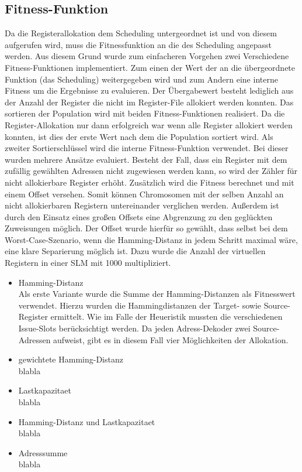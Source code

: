 \subsection{Fitness-Funktion}
\label{chap:Fitness-Funktion}
Da die Registerallokation dem Scheduling untergeordnet ist und von diesem aufgerufen wird, muss die Fitnessfunktion an die des Scheduling angepasst werden. Aus diesem Grund wurde zum einfacheren Vorgehen zwei Verschiedene Fitness-Funktionen implementiert. Zum einen der Wert der an die übergeordnete Funktion (das Scheduling) weitergegeben wird und zum Andern eine interne Fitness um die Ergebnisse zu evaluieren.
Der Übergabewert besteht lediglich aus der Anzahl der Register die nicht im Register-File allokiert werden konnten. Das sortieren der Population wird mit beiden Fitness-Funktionen realisiert. Da die Register-Allokation nur dann erfolgreich war wenn alle Register allokiert werden konnten, ist dies der erste Wert nach dem die Population sortiert wird. Als zweiter Sortierschlüssel wird die interne Fitness-Funktion verwendet. Bei dieser wurden mehrere Ansätze evaluiert.
Besteht der Fall, dass ein Register mit dem zufällig gewählten Adressen nicht zugewiesen werden kann, so wird der Zähler für nicht allokierbare Register erhöht. Zusätzlich wird die Fitness berechnet und mit einem Offset versehen. Somit können Chromosomen mit der selben Anzahl an nicht allokierbaren Registern untereinander verglichen werden. Außerdem ist durch den Einsatz eines großen Offsets eine Abgrenzung zu den geglückten Zuweisungen möglich. Der Offset wurde hierfür  so gewählt, dass selbst bei dem Worst-Case-Szenario, wenn die Hamming-Distanz in jedem Schritt maximal wäre, eine klare Separierung möglich ist. Dazu wurde die Anzahl der virtuellen Registern in einer SLM mit 1000 multipliziert.
\begin{itemize}
	\item Hamming-Distanz\\
		Als erste Variante wurde die Summe der Hamming-Distanzen als Fitnesswert verwendet. Hierzu wurden die Hammingdistanzen der Target- sowie Source-Register ermittelt. Wie im Falle der Heueristik mussten die verschiedenen Issue-Slots berücksichtigt werden. Da jeden Adress-Dekoder zwei Source-Adressen aufweist, gibt es in diesem Fall vier Möglichkeiten der Allokation.
	\item gewichtete Hamming-Distanz\\
		blabla
	\item Lastkapazitaet\\
		blabla
	\item Hamming-Distanz und Lastkapazitaet\\
		blabla
	\item Adresssumme\\
		blabla
\end{itemize}
 
